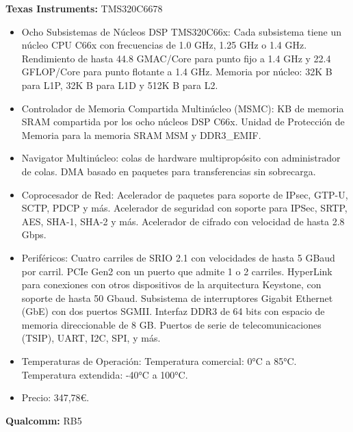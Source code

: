 \documentclass[11pt]{report}
\begin{document}
\textbf{Texas Instruments:} TMS320C6678
\begin{itemize}
  \item Ocho Subsistemas de Núcleos DSP TMS320C66x:
        \subitem Cada subsistema tiene un núcleo CPU C66x con frecuencias de 1.0 GHz, 1.25 GHz o 1.4 GHz.
        \subitem Rendimiento de hasta 44.8 GMAC/Core para punto fijo a 1.4 GHz y 22.4 GFLOP/Core para punto flotante a 1.4 GHz.
        \subitem Memoria por núcleo: 32K B para L1P, 32K B para L1D y 512K B para L2.

  \item Controlador de Memoria Compartida Multinúcleo (MSMC):
         KB de memoria SRAM compartida por los ocho núcleos DSP C66x.
        \subitem Unidad de Protección de Memoria para la memoria SRAM MSM y DDR3\_EMIF.

        \newpage

  \item Navigator Multinúcleo:
         colas de hardware multipropósito con administrador de colas.
        \subitem DMA basado en paquetes para transferencias sin sobrecarga.

  \item Coprocesador de Red:
        \subitem Acelerador de paquetes para soporte de IPsec, GTP-U, SCTP, PDCP y más.
        \subitem Acelerador de seguridad con soporte para IPSec, SRTP, AES, SHA-1, SHA-2 y más.
        \subitem Acelerador de cifrado con velocidad de hasta 2.8 Gbps.

  \item Periféricos:
        \subitem Cuatro carriles de SRIO 2.1 con velocidades de hasta 5 GBaud por carril.
        \subitem PCIe Gen2 con un puerto que admite 1 o 2 carriles.
        \subitem HyperLink para conexiones con otros dispositivos de la arquitectura Keystone, con soporte de hasta 50 Gbaud.
        \subitem Subsistema de interruptores Gigabit Ethernet (GbE) con dos puertos SGMII.
        \subitem Interfaz DDR3 de 64 bits con espacio de memoria direccionable de 8 GB.
        \subitem Puertos de serie de telecomunicaciones (TSIP), UART, I2C, SPI, y más.

  \item Temperaturas de Operación:
        \subitem Temperatura comercial: 0°C a 85°C.
        \subitem Temperatura extendida: -40°C a 100°C.

  \item Precio: 347,78\euro. 
\end{itemize}

\textbf{Qualcomm:} RB5
\end{document}
